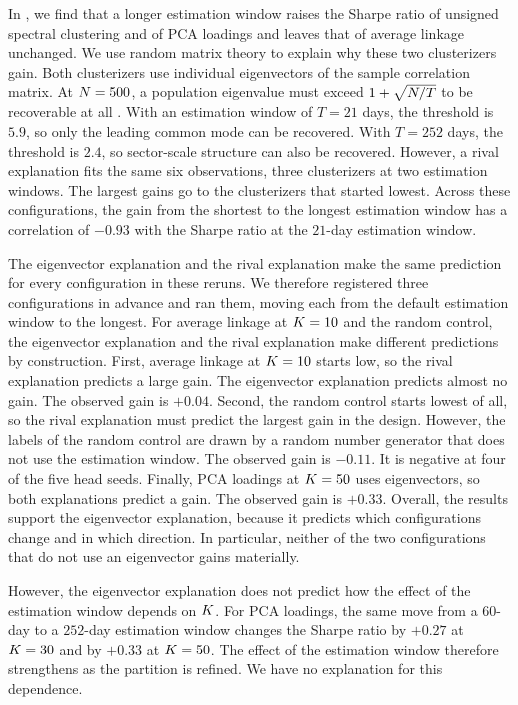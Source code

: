 In , we find that a longer estimation window raises the Sharpe ratio of unsigned spectral clustering and of PCA loadings and leaves that of average linkage unchanged. We use random matrix theory to explain why these two clusterizers gain. Both clusterizers use individual eigenvectors of the sample
correlation matrix. At $N = 500$, a population eigenvalue must exceed $1 + \sqrt{N/T}$ to be recoverable at all \citep{baik2005phase}. With an estimation window of $T = 21$ days, the threshold is $5.9$, so only the leading common mode can be recovered. With $T = 252$ days, the threshold is $2.4$, so sector-scale structure can also be recovered. However, a rival explanation fits the same six observations, three clusterizers at two estimation windows. The largest gains go to the clusterizers that started lowest. Across these configurations, the gain from the shortest to the longest estimation window has a correlation of $-0.93$ with the Sharpe ratio at the $21$-day estimation window.

The eigenvector explanation and the rival explanation make the same prediction for every configuration in these reruns. We therefore registered three configurations in advance and ran them, moving each from the default estimation window to the longest. For average linkage at $K=10$ and the random control, the eigenvector explanation and the rival explanation make different predictions by construction. First, average linkage at
$K=10$ starts low, so the rival explanation predicts a large gain. The
eigenvector explanation predicts almost no gain. The observed gain is $+0.04$. Second, the random
control starts lowest of all, so the rival explanation must predict the largest
gain in the design. However, the labels of the random control are drawn by a random number
generator that does not use the estimation window. The observed gain is $-0.11$. It is negative at four of the five head seeds. Finally, PCA loadings at $K=50$ uses eigenvectors, so both explanations predict a gain. The observed gain is $+0.33$. Overall, the results support the eigenvector explanation, because it predicts which configurations change and in which direction.
In particular, neither of the two configurations that do not use an eigenvector gains materially.

However, the eigenvector explanation does not predict how the effect of the estimation window depends on $K$. For PCA loadings, the same move from a 60-day to a $252$-day estimation window changes the Sharpe ratio by
$+0.27$ at $K=30$ and by $+0.33$ at $K=50$. The effect of the estimation window therefore strengthens as the partition is refined. We have no explanation for this dependence.

